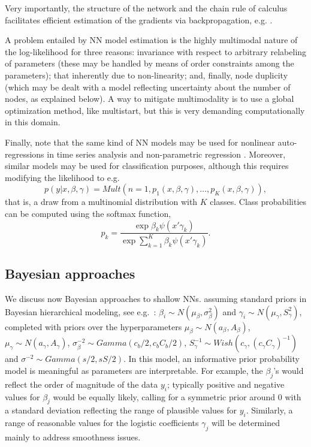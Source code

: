 \noindent    Very importantly,  the structure of the network and the 
    chain rule of calculus %
    facilitates efficient estimation of the gradients 
    via backpropagation, e.g. \cite{rumelhart1986learning}.
    
    A problem entailed by NN model estimation is the highly multimodal nature of
    the log-likelihood for three reasons:
    invariance with respect to arbitrary relabeling of
    parameters (these may
    be handled by means of order 
    constraints among the 
    parameters);
    that inherently due to non-linearity; and, finally, 
    node duplicity (which may be dealt 
    with a model reflecting uncertainty 
    about the number of nodes,
    as explained below).
A way to mitigate multimodality is to use a global optimization method, like multistart, but
this is very demanding computationally in this domain.

Finally, note that the same kind of NN models 
may be used for nonlinear auto-regressions in
time series analysis \cite{menchero} and 
non-parametric 
regression \cite{insuamuller}. Moreover,
similar models may be used for classification purposes,
although this 
 requires modifying the likelihood
\cite{bishop} to e.g.\
\begin{equation}
    p(y | x, \beta, \gamma) = Mult(n=1, 
    p_1 (x, \beta, \gamma) , \ldots, p_K (x, \beta, \gamma) ),
\end{equation}
that is, a draw from a multinomial distribution with $K$ classes. 
Class probabilities
 can be computed using the softmax function,
$$
p_k = \frac{\exp{\beta_k \psi(x'\gamma_k)}}{\exp{\sum_{k=1}^K \beta_k \psi(x'\gamma_k)}}.
$$


\subsection{Bayesian approaches}\label{bayeshallow}
We discuss now Bayesian approaches to shallow NNs.
assuming standard priors 
in Bayesian hierarchical modeling, see e.g.\ \cite{LavineWest}: 
$  \beta_i      \sim  N(\mu_\beta,\sigma_\beta^2)$
and 
  $\gamma_i     \sim  N(\mu_\gamma,S_\gamma^2)$,
  completed with priors over the hyperparameters
$\mu_\beta \sim N(a_\beta,A_\beta)$,
$\mu_\gamma \sim N(a_\gamma,A_\gamma)$,
$\sigma^{-2}_\beta \sim Gamma(c_b/2,c_bC_b/2)$,
$S_\gamma^{-1} \sim Wish(c_\gamma,(c_\gamma C_\gamma)^{-1})$ and
$\sigma^{-2} \sim Gamma(s/2, sS/2)$.
In this model, 
an informative prior probability model
is meaningful as parameters are interpretable. For example, the $\beta_ j$’s would reflect the
order of magnitude of the data $y_i$; typically positive and negative values for
$\beta _j$ would be equally likely, calling for a symmetric prior around 
0 with
a standard deviation reflecting the range of plausible values for $y_i$. Similarly,
a range of reasonable values for the logistic coefficients $\gamma_ j$ will be determined
mainly to address smoothness
issues.

